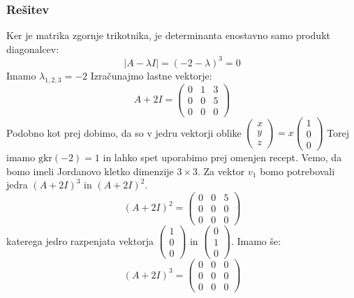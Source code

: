 \documentclass{article}
\begin{document}
\subsubsection*{Rešitev}
Ker je matrika zgornje trikotnika, je determinanta enostavno samo produkt diagonalcev:
\begin{equation*}
|A-\lambda I | = (-2-\lambda)^3 = 0
\end{equation*}
Imamo $\lambda_{1,2,3} = -2$
Izračunajmo lastne vektorje:
\begin{equation*}
A+2I = 
\begin{pmatrix}
0 & 1 & 3 \\
0 & 0 & 5 \\
0 & 0 & 0
\end{pmatrix}
\end{equation*}
Podobno kot prej dobimo, da so v jedru vektorji oblike $\begin{pmatrix} x \\ y \\ z \end{pmatrix} = x \begin{pmatrix} 1 \\ 0 \\ 0 \end{pmatrix}$
Torej imamo $\mathrm{gkr}(-2) = 1$ in lahko spet uporabimo prej omenjen recept. Vemo, da bomo imeli Jordanovo kletko dimenzije $3 \times 3$.
Za vektor $v_1$ bomo potrebovali jedra $(A+2I)^3$ in $(A+2I)^2$.
\begin{equation*}
(A+2I)^2 = 
\begin{pmatrix}
0 & 0 & 5 \\
0 & 0 & 0 \\
0 & 0 & 0
\end{pmatrix}
\end{equation*}
katerega jedro razpenjata vektorja $\begin{pmatrix} 1 \\ 0 \\ 0 \end{pmatrix}$ in $\begin{pmatrix} 0 \\ 1 \\ 0 \end{pmatrix}$.
Imamo še:
\begin{equation*}
(A+2I)^3 = 
\begin{pmatrix}
0 & 0 & 0 \\
0 & 0 & 0 \\
0 & 0 & 0
\end{pmatrix}
\end{equation*}
\end{document}
